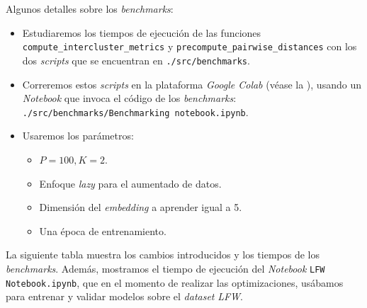 Algunos detalles sobre los \textit{benchmarks}:

\begin{itemize}
	\item Estudiaremos los tiempos de ejecución de las funciones \lstinline{compute_intercluster_metrics} y \lstinline{precompute_pairwise_distances} con los dos \textit{scripts} que se encuentran en \lstinline{./src/benchmarks}.
	\item Correremos estos \textit{scripts} en la plataforma \textit{Google Colab} (véase la ), usando un \textit{Notebook} que invoca el código de los \textit{benchmarks}: \lstinline{./src/benchmarks/Benchmarking notebook.ipynb}.
	\item Usaremos los parámetros:
	      \begin{itemize}
		      \item $P = 100, K = 2$.
		      \item Enfoque \textit{lazy} para el aumentado de datos.
		      \item Dimensión del \textit{embedding} a aprender igual a 5.
		      \item Una época de entrenamiento.
	      \end{itemize}
\end{itemize}

La siguiente tabla muestra los cambios introducidos y los tiempos de los \textit{benchmarks}. Además, mostramos el tiempo de ejecución del \textit{Notebook} \lstinline{LFW Notebook.ipynb}, que en el momento de realizar las optimizaciones, usábamos para entrenar y validar modelos sobre el \textit{dataset} \textit{LFW}.

